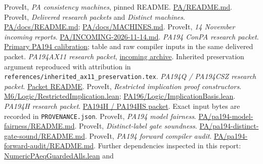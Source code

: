 \documentclass[11pt,a4paper]{article}
\newcommand{\file}[1]{\texttt{\nolinkurl{#1}}}
\newcommand{\repo}[2]{\href{https://github.com/VladimirReshetnikov/ProveIt/blob/1c9524d8bf2e0a27b9a16ff622359927f536e663/#1}{#2}}
\begin{document}
\clearpage
\begin{thebibliography}{30}
 ProveIt, \emph{PA consistency machines}, pinned README.
\repo{Computability/BusyBeaver/Research/PA/README.md}{PA/README.md}.
 ProveIt, \emph{Delivered research packets} and \emph{Distinct machines}.
\repo{Computability/BusyBeaver/Research/PA/docs/README.md}{PA/docs/README.md};
\repo{Computability/BusyBeaver/Research/PA/docs/MACHINES.md}{PA/docs/MACHINES.md}.
 ProveIt, \emph{14 November incoming reports}.
\repo{Computability/BusyBeaver/Research/PA/INCOMING-2026-11-14.md}{PA/INCOMING-2026-11-14.md}.
 \emph{PA194 ConPA research packet}.
\repo{Computability/BusyBeaver/Research/PA/docs/pa194_conpa_2026-11-13/report/calibration.tex}{Primary PA194 calibration};
table and raw compiler inputs in the same delivered packet.
 \emph{PA194AX11 research packet},
\href{https://github.com/VladimirReshetnikov/ProveIt/blob/1c9524d8bf2e0a27b9a16ff622359927f536e663/docs/incoming/pa194_ax11_research_2026-11-14.zip}{incoming archive}.
Inherited preservation argument reproduced with attribution in
\file{references/inherited_ax11_preservation.tex}.
 \emph{PA194Q / PA194CSZ research packet}.
\repo{Computability/BusyBeaver/Research/PA/docs/pa194q_conpa_2026-11-13/README.txt}{Packet README}.
 ProveIt, \emph{Restricted implication proof constructors}.
\repo{Computability/BusyBeaver/Research/PA/jamesyc-upstream/pa196/M6/Logic/RestrictedImplication.lean}{M6/Logic/RestrictedImplication.lean};
\repo{Computability/BusyBeaver/Research/PA/jamesyc-upstream/pa196/PA196/Logic/ImplicationBasis.lean}{PA196/Logic/ImplicationBasis.lean}.
 \emph{PA194H research packet}.
\repo{Computability/BusyBeaver/Research/PA/docs/pa194hs_conpa_2026-11-13/README.md}{PA194H / PA194HS packet}.
Exact input bytes are recorded in \file{PROVENANCE.json}.
 ProveIt, \emph{PA194 model fairness}.
\repo{Computability/BusyBeaver/Research/PA/pa194-model-fairness/README.md}{PA/pa194-model-fairness/README.md}.
 ProveIt, \emph{Distinct-label gate soundness}.
\repo{Computability/BusyBeaver/Research/PA/pa194-distinct-gate-sound/README.md}{PA/pa194-distinct-gate-sound/README.md}.
 ProveIt, \emph{PA194 forward compiler audit}.
\repo{Computability/BusyBeaver/Research/PA/pa194-forward-audit/README.md}{PA/pa194-forward-audit/README.md}.
Further dependencies inspected in this report:
\repo{Computability/BusyBeaver/Research/PA/jamesyc-upstream/pa196/PA196/Arithmetic/Transport/NumericPAeqGuardedAlls.lean}{NumericPAeqGuardedAlls.lean} and

\end{thebibliography}
\end{document}
